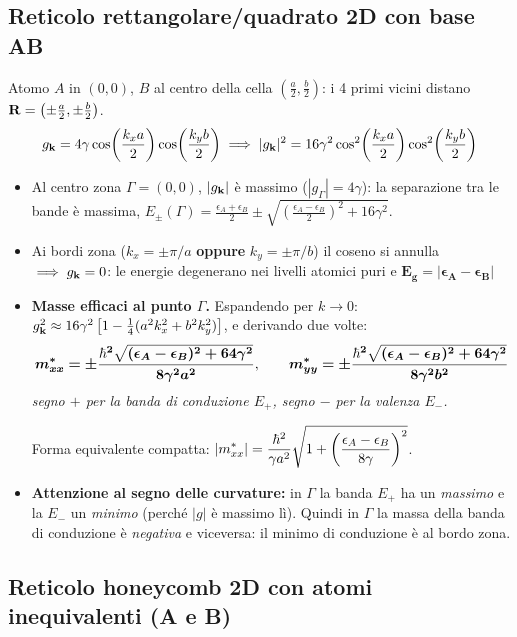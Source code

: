 \subsection{Reticolo rettangolare/quadrato 2D con base AB}
Atomo $A$ in $(0,0)$, $B$ al centro della cella $\left(\frac a2,\frac b2\right)$: i 4 primi vicini distano $\mathbf{R} = \left(\pm\frac a2,\pm\frac b2\right)$.
\[ g_{\mathbf{k}} = 4\gamma\cos\!\left(\frac{k_x a}{2}\right)\cos\!\left(\frac{k_y b}{2}\right)
   \implies |g_{\mathbf{k}}|^2 = 16\gamma^2\cos^2\!\left(\frac{k_x a}{2}\right)\cos^2\!\left(\frac{k_y b}{2}\right) \]
\begin{itemize}
    \item Al centro zona $\Gamma=(0,0)$, $|g_{\mathbf{k}}|$ è massimo ($|g_\Gamma|=4\gamma$): la separazione tra le bande è massima,
    $E_\pm(\Gamma)=\frac{\epsilon_A+\epsilon_B}{2}\pm\sqrt{\left(\frac{\epsilon_A-\epsilon_B}{2}\right)^2+16\gamma^2}$.
    \item Ai bordi zona ($k_x=\pm\pi/a$ \textbf{oppure} $k_y=\pm\pi/b$) il coseno si annulla $\implies g_{\mathbf{k}}=0$: le energie degenerano nei livelli atomici puri e $\bm{E_g = |\epsilon_A-\epsilon_B|}$
    \item \textbf{Masse efficaci al punto $\Gamma$.} Espandendo per $k\to0$:
    $g_{\mathbf{k}}^2 \approx 16\gamma^2\left[1-\frac14(a^2k_x^2+b^2k_y^2)\right]$, e derivando due volte:
    \[ \bm{m^*_{xx} = \pm\frac{\hbar^2\sqrt{(\epsilon_A-\epsilon_B)^2+64\gamma^2}}{8\gamma^2a^2}},\qquad
       \bm{m^*_{yy} = \pm\frac{\hbar^2\sqrt{(\epsilon_A-\epsilon_B)^2+64\gamma^2}}{8\gamma^2b^2}} \]
    \textit{segno $+$ per la banda di conduzione $E_+$, segno $-$ per la valenza $E_-$.}
    
    Forma equivalente compatta: $\displaystyle |m^*_{xx}| = \frac{\hbar^2}{\gamma a^2}\sqrt{1+\left(\frac{\epsilon_A-\epsilon_B}{8\gamma}\right)^2}$.
    \item \textbf{Attenzione al segno delle curvature:} in $\Gamma$ la banda $E_+$ ha un \emph{massimo} e la $E_-$ un \emph{minimo} (perché $|g|$ è massimo lì). Quindi in $\Gamma$ la massa della banda di conduzione è \emph{negativa} e viceversa: il minimo di conduzione è al bordo zona.
\end{itemize}

\subsection{Reticolo honeycomb 2D con atomi inequivalenti (A e B)}

